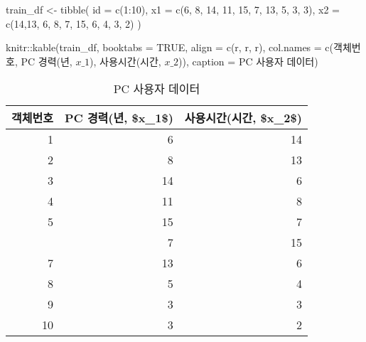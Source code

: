 \documentclass[
]{book}
\newenvironment{Shaded}{\begin{snugshade}}{\end{snugshade}}
\newcommand{\AttributeTok}[1]{\textcolor[rgb]{0.77,0.63,0.00}{#1}}
\newcommand{\ConstantTok}[1]{\textcolor[rgb]{0.00,0.00,0.00}{#1}}
\newcommand{\DecValTok}[1]{\textcolor[rgb]{0.00,0.00,0.81}{#1}}
\newcommand{\FunctionTok}[1]{\textcolor[rgb]{0.00,0.00,0.00}{#1}}
\newcommand{\NormalTok}[1]{#1}
\newcommand{\OtherTok}[1]{\textcolor[rgb]{0.56,0.35,0.01}{#1}}
\newcommand{\SpecialCharTok}[1]{\textcolor[rgb]{0.00,0.00,0.00}{#1}}
\newcommand{\StringTok}[1]{\textcolor[rgb]{0.31,0.60,0.02}{#1}}
\begin{document}
\begin{Shaded}
\begin{Highlighting}[]
\NormalTok{train\_df }\OtherTok{\textless{}{-}} \FunctionTok{tibble}\NormalTok{(}
  \AttributeTok{id =} \FunctionTok{c}\NormalTok{(}\DecValTok{1}\SpecialCharTok{:}\DecValTok{10}\NormalTok{),}
  \AttributeTok{x1 =} \FunctionTok{c}\NormalTok{(}\DecValTok{6}\NormalTok{, }\DecValTok{8}\NormalTok{, }\DecValTok{14}\NormalTok{, }\DecValTok{11}\NormalTok{, }\DecValTok{15}\NormalTok{, }\DecValTok{7}\NormalTok{, }\DecValTok{13}\NormalTok{, }\DecValTok{5}\NormalTok{, }\DecValTok{3}\NormalTok{, }\DecValTok{3}\NormalTok{),}
  \AttributeTok{x2 =} \FunctionTok{c}\NormalTok{(}\DecValTok{14}\NormalTok{,}\DecValTok{13}\NormalTok{, }\DecValTok{6}\NormalTok{, }\DecValTok{8}\NormalTok{, }\DecValTok{7}\NormalTok{, }\DecValTok{15}\NormalTok{, }\DecValTok{6}\NormalTok{, }\DecValTok{4}\NormalTok{, }\DecValTok{3}\NormalTok{, }\DecValTok{2}\NormalTok{)}
\NormalTok{)}

\NormalTok{knitr}\SpecialCharTok{::}\FunctionTok{kable}\NormalTok{(train\_df, }\AttributeTok{booktabs =} \ConstantTok{TRUE}\NormalTok{,}
             \AttributeTok{align =} \FunctionTok{c}\NormalTok{(}\StringTok{\textquotesingle{}r\textquotesingle{}}\NormalTok{, }\StringTok{\textquotesingle{}r\textquotesingle{}}\NormalTok{, }\StringTok{\textquotesingle{}r\textquotesingle{}}\NormalTok{),}
             \AttributeTok{col.names =} \FunctionTok{c}\NormalTok{(}\StringTok{\textquotesingle{}객체번호\textquotesingle{}}\NormalTok{, }\StringTok{\textquotesingle{}PC 경력(년, $x\_1$)\textquotesingle{}}\NormalTok{, }\StringTok{\textquotesingle{}사용시간(시간, $x\_2$)\textquotesingle{}}\NormalTok{),}
             \AttributeTok{caption =} \StringTok{\textquotesingle{}PC 사용자 데이터\textquotesingle{}}\NormalTok{)}
\end{Highlighting}
\end{Shaded}

\begin{table}

\caption{\label{tab:pc-user-data}PC 사용자 데이터}
\centering
\begin{tabular}[t]{rrr}
\toprule
객체번호 & PC 경력(년, \$x\_1\$) & 사용시간(시간, \$x\_2\$)\\
\midrule
1 & 6 & 14\\
2 & 8 & 13\\
3 & 14 & 6\\
4 & 11 & 8\\
5 & 15 & 7\\
\addlinespace
6 & 7 & 15\\
7 & 13 & 6\\
8 & 5 & 4\\
9 & 3 & 3\\
10 & 3 & 2\\
\bottomrule
\end{tabular}
\end{table}
\end{document}
